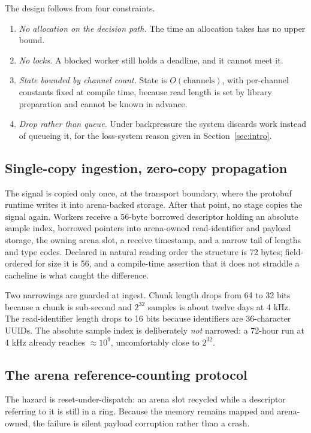 \documentclass[conference]{IEEEtran}
\begin{document}
The design follows from four constraints.
\begin{enumerate}
\item \emph{No allocation on the decision path.} The time an allocation takes has no upper
bound.
\item \emph{No locks.} A blocked worker still holds a deadline, and it cannot meet it.
\item \emph{State bounded by channel count.} State is $O(\text{channels})$, with per-channel
constants fixed at compile time, because read length is set by library preparation and cannot
be known in advance.
\item \emph{Drop rather than queue.} Under backpressure the system discards work instead of
queueing it, for the loss-system reason given in Section~\ref{sec:intro}.
\end{enumerate}

\subsection{Single-copy ingestion, zero-copy propagation}

The signal is copied only once, at the transport boundary, where the protobuf runtime writes it
into arena-backed storage. After that point, no stage copies the signal again. Workers receive a 56-byte borrowed
descriptor holding an absolute sample index, borrowed pointers into arena-owned
read-identifier and payload storage, the owning arena slot, a receive timestamp, and a narrow
tail of lengths and type codes. Declared in natural reading order the structure is 72 bytes;
field-ordered for size it is 56, and a compile-time assertion that it does not straddle a
cacheline is what caught the difference.

Two narrowings are guarded at ingest. Chunk length drops from 64 to 32 bits because a chunk is
sub-second and $2^{32}$ samples is about twelve days at 4 kHz. The read-identifier length drops
to 16 bits because identifiers are 36-character UUIDs. The absolute sample index is
deliberately \emph{not} narrowed: a 72-hour run at 4 kHz already reaches ${\approx}10^9$,
uncomfortably close to $2^{32}$.

\subsection{The arena reference-counting protocol}

The hazard is reset-under-dispatch: an arena slot recycled while a descriptor referring to it
is still in a ring. Because the memory remains mapped and arena-owned, the failure is silent
payload corruption rather than a crash.
\end{document}
